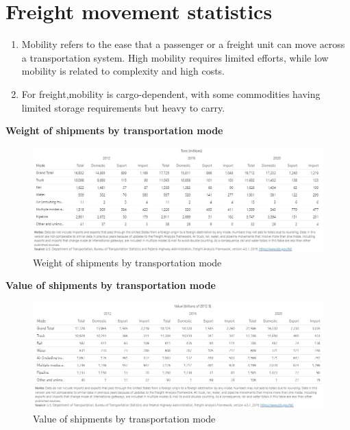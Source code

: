\documentclass[
]{book}
\begin{document}
\hypertarget{intro-statistics}{%
\section{Freight movement statistics}\label{intro-statistics}}

\begin{enumerate}
\def\labelenumi{\arabic{enumi})}
\item
  Mobility refers to the ease that a passenger or a freight unit can move across a transportation system. High mobility requires limited efforts, while low mobility is related to complexity and high costs.
\item
  For freight,mobility is cargo-dependent, with some commodities having limited storage requirements but heavy to carry.
\end{enumerate}

\textbf{Weight of shipments by transportation mode}

\begin{figure}

{\centering \includegraphics{./Images/FreightShipments_Weight} 

}

\caption{Weight of shipments by transportation mode}\label{fig:FreightByWeightImage}
\end{figure}

\textbf{Value of shipments by transportation mode}

\begin{figure}

{\centering \includegraphics{./Images/FreightShipments_Value} 

}

\caption{Value of shipments by transportation mode}\label{fig:FreightByValueImage}
\end{figure}
\end{document}
